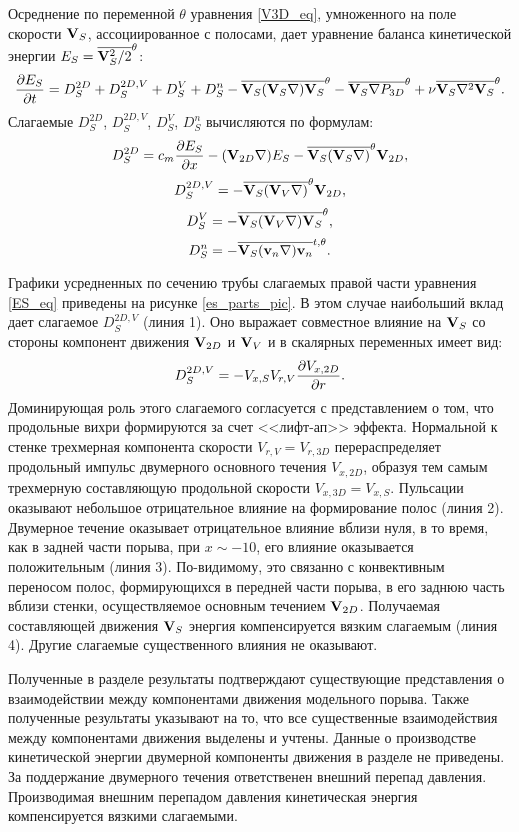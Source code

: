 Осреднение по переменной $\theta$ уравнения \eqref{V3D_eq}, умноженного на поле скорости $\mathbf{V}_S$,  ассоциированное с полосами, дает уравнение баланса кинетической энергии $E_S = \overline{\mathbf{V}_S^2/2}^\theta$:
\begin{equation}\label{ES_eq}
\frac{\partial E_S}{\partial t} = D_S^{2D} + D_S^{2D,V} + D_S^V + D_S^n - \overline{\mathbf{V}_S (\mathbf{V}_S \nabla) \mathbf{V}_S}^\theta - \overline{\mathbf{V}_S \nabla P_{3D}}^\theta + \nu \overline{\mathbf{V}_S \nabla^2 \mathbf{V}_S}^\theta.
\end{equation} 
Слагаемые $D_S^{2D}$, $D_S^{2D,V}$, $D_S^V$, $D_S^n$ вычисляются по формулам:
$$
D_S^{2D} = c_m \frac{\partial E_S}{\partial x} - (\mathbf{V}_{2D} \nabla) E_S - \overline{\mathbf{V}_S (\mathbf{V}_S \nabla)}^\theta \mathbf{V}_{2D},
$$
$$
D_S^{2D,V} = - \overline{\mathbf{V}_S (\mathbf{V}_V \nabla)}^\theta \mathbf{V}_{2D},
$$
$$
D_S^{V} = - \overline{\mathbf{V}_S (\mathbf{V}_V \nabla) \mathbf{V}_S}^\theta,
$$
$$
D_S^n = - \overline{\mathbf{V}_S (\mathbf{v}_n \nabla) \mathbf{v}_n}^{t,\theta}.
$$

Графики усредненных по сечению трубы слагаемых правой части уравнения \eqref{ES_eq} приведены на рисунке \ref{es_parts_pic}. В этом случае наибольший вклад дает слагаемое $D_S^{2D,V}$ (линия 1). Оно выражает совместное влияние на $\mathbf{V}_S$ со стороны компонент движения $\mathbf{V}_{2D}$ и $\mathbf{V}_V$ и в скалярных переменных имеет вид:
$$
D_S^{2D,V} =  - V_{x, S} V_{r, V} \frac{\partial V_{x, 2D}}{\partial r}.
$$
Доминирующая роль этого слагаемого согласуется с представлением о том, что продольные вихри формируются за счет <<лифт-ап>> эффекта. Нормальной к стенке трехмерная компонента скорости $V_{r,V} = V_{r,3D}$ перераспределяет продольный импульс двумерного основного течения $V_{x, 2D}$, образуя тем самым трехмерную составляющую продольной скорости $V_{x,3D} = V_{x,S}$. Пульсации оказывают небольшое отрицательное влияние на формирование полос (линия 2). Двумерное течение оказывает отрицательное влияние вблизи нуля, в то время, как в задней части порыва, при $x \sim -10$, его влияние оказывается положительным (линия 3). По-видимому, это связанно с конвективным переносом полос, формирующихся в передней части порыва, в его заднюю часть вблизи стенки, осуществляемое основным течением $\mathbf{V}_{2D}$. Получаемая составляющей движения $\mathbf{V}_S$ энергия компенсируется вязким слагаемым (линия 4). Другие слагаемые существенного влияния не оказывают. 

Полученные в разделе результаты подтверждают существующие представления о взаимодействии между компонентами движения модельного порыва. Также полученные результаты указывают на то, что все существенные взаимодействия между компонентами движения выделены и учтены. Данные о производстве кинетической энергии двумерной компоненты движения в разделе не приведены. За поддержание двумерного течения ответственен внешний перепад давления. Производимая внешним перепадом давления кинетическая энергия компенсируется вязкими слагаемыми. 



